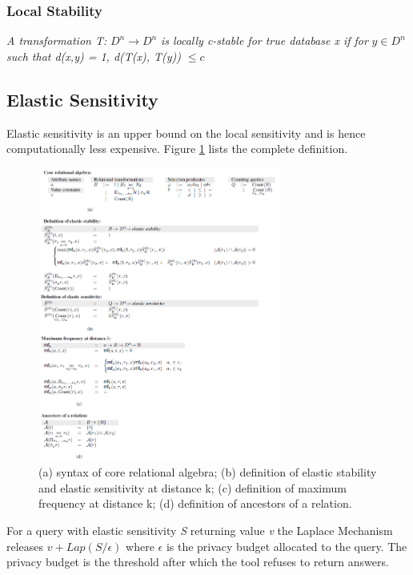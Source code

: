 \documentclass[acmsmall]{acmart}
\begin{document}
\subsubsection{Local Stability}
\textit{A transformation T: }\begin{math} D^n \rightarrow D^n \end{math} \textit{is locally c-stable for true database x if for }\begin{math} y \in D^n\end{math} \textit{such that d(x,y) = 1, d(T(x), T(y)) }\begin{math}\leq c\end{math}

\subsection{Elastic Sensitivity}
Elastic sensitivity is an upper bound on the local sensitivity and is hence computationally less expensive. Figure \ref{A.3.1} lists the complete definition.
\begin{figure}[htp]
    \centering
    \includegraphics[width=8cm]{ES.PNG}
    \caption{(a) syntax of core relational algebra; (b) definition of elastic stability and elastic sensitivity
at distance k; (c) definition of maximum frequency at distance k; (d) definition of ancestors
of a relation.}
    \label{A.3.1}
\end{figure}
\newline
For a query with elastic sensitivity \textit{S} returning value \textit{v} the Laplace Mechanism releases \begin{math} v + Lap(S/\epsilon) \end{math} where \begin{math}\epsilon\end{math} is the privacy budget allocated to the query. The privacy budget is the threshold after which the tool refuses to return answers.
\end{document}
